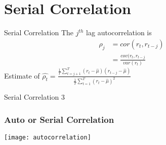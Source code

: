 \documentclass[14pt,xcolor=pdftex,dvipsnames,table]{beamer}
\begin{document}
\section{Serial Correlation}
\begin{frame}{Serial Correlation}
The $j^{th}$ lag autocorrelation is 
\begin{align*}
\rho_j &= cor(r_t, r_{t-j})\\
 &= \frac{cov(r_t, r_{t-j}}{var({r_t})}
\end{align*}
Estimate of $\hat{\rho_t} = \frac{\frac{1}{T} \sum_{t=j+1}^T (r_t - \hat{\mu})(r_{t-j} - \hat{\mu})}{\frac{1}{T} \sum_{t=1}^T (r_t - \hat{\mu})^2}$
\end{frame}


\begin{frame}{Serial Correlation 3}
\graphicspath{{Pictures/}}
\frametitle{Auto or Serial Correlation}
\begin{center}
\texttt{[image: autocorrelation]}
\end{center}
\end{frame}







\end{document}
